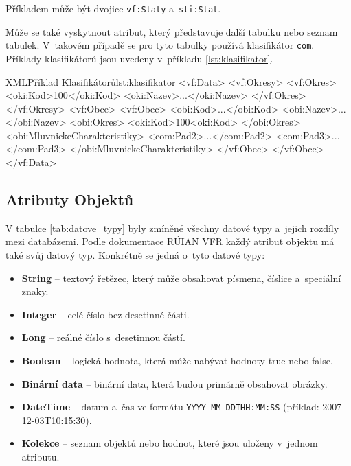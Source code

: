 Příkladem může být dvojice \texttt{vf:Staty} a~\texttt{sti:Stat}.

Může se také vyskytnout atribut, který představuje další tabulku nebo seznam tabulek.
V~takovém případě se pro tyto tabulky používá klasifikátor \texttt{com}.
Příklady klasifikátorů jsou uvedeny v~příkladu \ref{lst:klasifikator}. 

\begin{code}{XML}{Příklad Klasifikátorů}{lst:klasifikator}
<vf:Data>
    <vf:Okresy>
        <vf:Okres>
            <oki:Kod>100</oki:Kod>
            <oki:Nazev>...</oki:Nazev>
        </vf:Okres>
    </vf:Okresy>
    <vf:Obce>
        <vf:Obec>
            <obi:Kod>...</obi:Kod>
            <obi:Nazev>...</obi:Nazev>
            <obi:Okres>
                <oki:Kod>100<oki:Kod>
            </obi:Okres>
            <obi:MluvnickeCharakteristiky>
                <com:Pad2>...</com:Pad2>
                <com:Pad3>...</com:Pad3>
            </obi:MluvnickeCharakteristiky>
        </vf:Obec>
    </vf:Obce>
</vf:Data>
\end{code}

\subsection{Atributy Objektů}
V tabulce \ref{tab:datove_typy} byly zmíněné všechny datové typy a~jejich rozdíly mezi databázemi.
Podle dokumentace RÚIAN VFR \cite{ruian_vfr} každý atribut objektu má také svůj datový typ.
Konkrétně se jedná o~tyto datové typy:
\begin{itemize}
    \item \textbf{String} -- textový řetězec, který může obsahovat písmena, číslice a~speciální znaky.
    \item \textbf{Integer} -- celé číslo bez desetinné části.
    \item \textbf{Long} -- reálné číslo s~desetinnou částí.
    \item \textbf{Boolean} -- logická hodnota, která může nabývat hodnoty true nebo false.
    \item \textbf{Binární data} -- binární data, která budou primárně obsahovat obrázky.
    \item \textbf{DateTime} -- datum a~čas ve formátu \texttt{YYYY-MM-DDTHH:MM:SS} (příklad: 2007-12-03T10:15:30).
    \item \textbf{Kolekce} -- seznam objektů nebo hodnot, které jsou uloženy v~jednom atributu.
\end{itemize}


